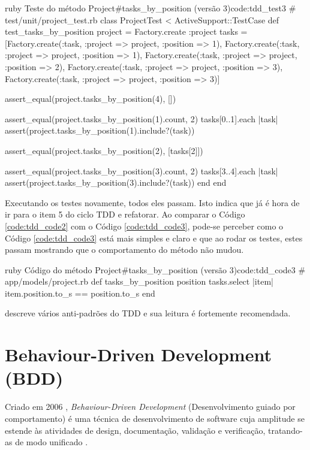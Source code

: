 \begin{mycode}{ruby}%
{Teste do método Project\#tasks\_by\_position (versão 3)}{code:tdd_test3}
# test/unit/project_test.rb
class ProjectTest < ActiveSupport::TestCase
  def test_tasks_by_position
    project = Factory.create :project
    tasks = [Factory.create(:task, :project => project, :position => 1),
             Factory.create(:task, :project => project, :position => 1),
             Factory.create(:task, :project => project, :position => 2),
             Factory.create(:task, :project => project, :position => 3),
             Factory.create(:task, :project => project, :position => 3)]

    assert_equal(project.tasks_by_position(4), [])

    assert_equal(project.tasks_by_position(1).count, 2)
    tasks[0..1].each { |task| assert(project.tasks_by_position(1).include?(task)) }

    assert_equal(project.tasks_by_position(2), [tasks[2]])

    assert_equal(project.tasks_by_position(3).count, 2)
    tasks[3..4].each { |task| assert(project.tasks_by_position(3).include?(task)) }
  end
end
\end{mycode}

Executando os testes novamente, todos eles passam. Isto indica que já é hora de ir para o item 5 do ciclo TDD e refatorar. Ao comparar o Código \ref{code:tdd_code2} com o Código \ref{code:tdd_code3}, pode-se perceber como o Código \ref{code:tdd_code3} está mais simples e claro e que ao rodar os testes, estes passam mostrando que o comportamento do método não mudou.

\begin{mycode}{ruby}%
{Código do método Project\#tasks\_by\_position (versão 3)}{code:tdd_code3}
# app/models/project.rb
def tasks_by_position position
  tasks.select { |item| item.position.to_s == position.to_s }
end
\end{mycode}

 descreve vários anti-padrões do TDD e sua leitura é fortemente recomendada.


\section{Behaviour-Driven Development (BDD)}

Criado em 2006 \cite{IntroducingBDD}, \textit{Behaviour-Driven Development} (Desenvolvimento guiado por comportamento) é uma técnica de desenvolvimento de software cuja amplitude se estende às atividades de design, documentação, validação e verificação, tratando-as de modo unificado \cite{BDDRodrigo}.


